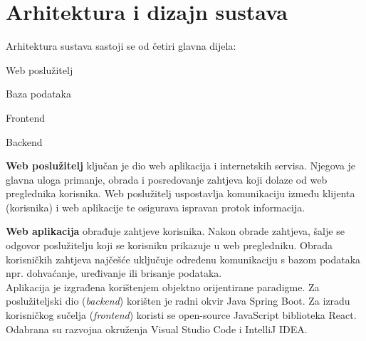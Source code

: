 \chapter{Arhitektura i dizajn sustava}

		


		\noindent Arhitektura sustava sastoji se od četiri glavna dijela: 
		
		\begin{packed_item}
			\item Web poslužitelj
			\item Baza podataka
			\item Frontend
			\item Backend
		\end{packed_item}
		
		\textbf{Web poslužitelj} ključan je dio web aplikacija i internetskih servisa. Njegova je glavna uloga primanje, obrada i posredovanje zahtjeva koji dolaze od web preglednika korisnika. Web poslužitelj uspostavlja komunikaciju između klijenta (korisnika) i web aplikacije te osigurava ispravan protok informacija.
		
		\textbf{Web aplikacija} obrađuje zahtjeve korisnika. Nakon obrade zahtjeva, šalje se odgovor poslužitelju koji se korisniku prikazuje u web pregledniku. Obrada korisničkih zahtjeva najčešće uključuje određenu komunikaciju s bazom podataka npr. dohvaćanje, uređivanje ili brisanje podataka. \\
		
				
		Aplikacija je izgrađena korištenjem objektno orijentirane paradigme. Za poslužiteljski dio (\textit{backend}) korišten je radni okvir Java Spring Boot. Za izradu korisničkog sučelja (\textit{frontend}) koristi se open-source JavaScript biblioteka React. Odabrana su razvojna okruženja Visual Studio Code i IntelliJ IDEA.\\
		 

